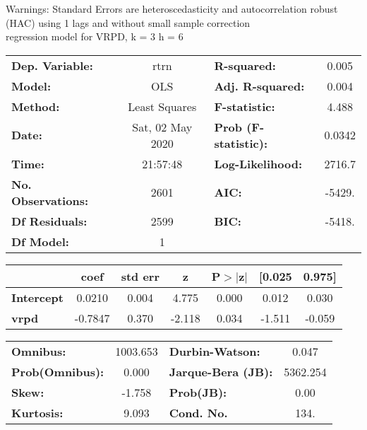 Warnings: \newline
 [1] Standard Errors are heteroscedasticity and autocorrelation robust (HAC) using 1 lags and without small sample correction\\ 

regression model for VRPD, k = 3 h = 6\begin{center}
\begin{tabular}{lclc}
\toprule
\textbf{Dep. Variable:}    &       rtrn       & \textbf{  R-squared:         } &     0.005   \\
\textbf{Model:}            &       OLS        & \textbf{  Adj. R-squared:    } &     0.004   \\
\textbf{Method:}           &  Least Squares   & \textbf{  F-statistic:       } &     4.488   \\
\textbf{Date:}             & Sat, 02 May 2020 & \textbf{  Prob (F-statistic):} &   0.0342    \\
\textbf{Time:}             &     21:57:48     & \textbf{  Log-Likelihood:    } &    2716.7   \\
\textbf{No. Observations:} &        2601      & \textbf{  AIC:               } &    -5429.   \\
\textbf{Df Residuals:}     &        2599      & \textbf{  BIC:               } &    -5418.   \\
\textbf{Df Model:}         &           1      & \textbf{                     } &             \\
\bottomrule
\end{tabular}
\begin{tabular}{lcccccc}
                   & \textbf{coef} & \textbf{std err} & \textbf{z} & \textbf{P$> |$z$|$} & \textbf{[0.025} & \textbf{0.975]}  \\
\midrule
\textbf{Intercept} &       0.0210  &        0.004     &     4.775  &         0.000        &        0.012    &        0.030     \\
\textbf{vrpd}      &      -0.7847  &        0.370     &    -2.118  &         0.034        &       -1.511    &       -0.059     \\
\bottomrule
\end{tabular}
\begin{tabular}{lclc}
\textbf{Omnibus:}       & 1003.653 & \textbf{  Durbin-Watson:     } &    0.047  \\
\textbf{Prob(Omnibus):} &   0.000  & \textbf{  Jarque-Bera (JB):  } & 5362.254  \\
\textbf{Skew:}          &  -1.758  & \textbf{  Prob(JB):          } &     0.00  \\
\textbf{Kurtosis:}      &   9.093  & \textbf{  Cond. No.          } &     134.  \\
\bottomrule
\end{tabular}
\end{center}

